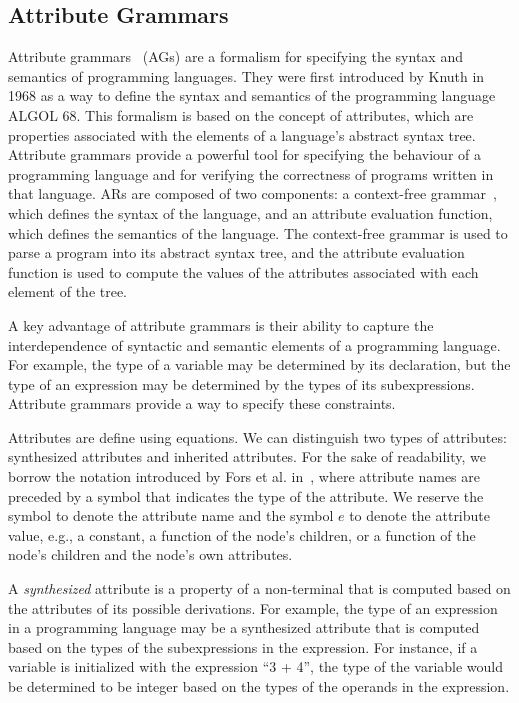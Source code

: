 \subsection{Attribute Grammars}
\label{chap:attr-grammars}
Attribute grammars~\cite{knuth1968semantics} (AGs) are a formalism for specifying
the syntax and semantics of programming languages.
They were first introduced by Knuth in 1968 as a way to define the syntax and semantics of the programming
language ALGOL 68. This formalism is based on the concept of attributes,
which are properties associated with the elements of a language's abstract syntax tree.
Attribute grammars provide a powerful tool for specifying the behaviour of a programming
language and for verifying the correctness of programs written in that language.
%
ARs are composed of two components: a context-free grammar~\cite{CREMERS197586},
which defines the syntax of the language, and an attribute evaluation function,
which defines the semantics of the language. The context-free grammar is used to
parse a program into its abstract syntax tree, and the attribute evaluation function
is used to compute the values of the attributes associated with each element
of the tree.

A key advantage of attribute grammars is their ability to capture the
interdependence of syntactic and semantic elements of a programming language.
For example, the type of a variable may be determined by its declaration,
but the type of an expression may be determined by the types of its subexpressions.
Attribute grammars provide a way to specify these constraints.

Attributes are define using equations. We can distinguish two types of
attributes: synthesized attributes and inherited attributes.
For the sake of readability, we borrow the notation introduced by Fors et al. in~\cite{fors2020patterns},
where attribute names are preceded by a symbol that indicates the type of the attribute.
We reserve the symbol  to denote the attribute name and the symbol $e$ to denote the attribute value,
e.g., a constant, a function of the node's children, or a function of the node's children
and the node's own attributes.

A \emph{synthesized} attribute is a property of a non-terminal that is computed
based on the attributes of its possible derivations. For example, the type of an expression
in a programming language may be a synthesized attribute that is computed based
on the types of the subexpressions in the expression. For instance, if a variable is initialized
with the expression ``3 + 4'', the type of the variable would be determined to
be integer based on the types of the operands in the expression.

